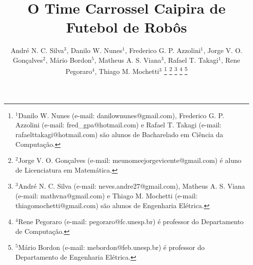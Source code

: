 \title{\LARGE \bf
O Time Carrossel Caipira de Futebol de Robôs
}

%
\author{{\centering André N. C. Silva$^{3}$, Danilo W. Nunes$^{1}$, Frederico G. P. Azzolini$^{1}$, Jorge V. O. Gonçalves$^{2}$, Mário Bordon$^{5}$,}%
{\authorblockN \centering Matheus A. S. Viana$^{3}$, Rafael T. Takagi$^{1}$, Rene Pegoraro$^{4}$, Thiago M. Mochetti$^{3}$}%
%
\thanks{$^{1}$Danilo W. Nunes (e-mail: danilownunes@gmail.com), Frederico G. P. Azzolini (e-mail: fred\_gpa@hotmail.com) e Rafael T. Takagi (e-mail: rafaelttakagi@hotmail.com) são alunos de Bacharelado em Ciência da Computação.}
\thanks{$^{2}$Jorge V. O. Gonçalves (e-mail: meunomeejorgevicente@gmail.com) é aluno de Licenciatura em Matemática.}
\thanks{$^{3}$André N. C. Silva (e-mail: neves.andre27@gmail.com), Matheus A. S. Viana (e-mail: mathvna@gmail.com) e Thiago M. Mochetti (e-mail: thiagomochetti@gmail.com) são alunos de Engenharia Elétrica.}
\thanks{$^{4}$Rene Pegoraro (e-mail: pegoraro@fc.unesp.br) é professor do Departamento de Computação.}
\thanks{$^{5}$Mário Bordon (e-mail: mebordon@feb.unesp.br) é professor do Departamento de Engenharia Elétrica.}
}